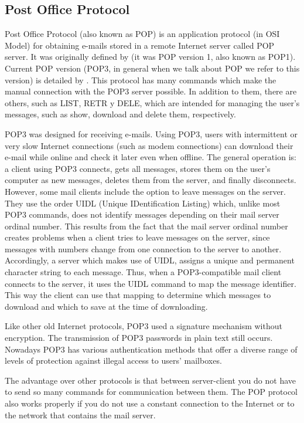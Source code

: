 \subsection{Post Office Protocol} \label{ssect:pop}

Post Office Protocol (also known as POP) is an application protocol (in OSI Model) for obtaining e-mails stored in a remote Internet server called POP server. It was originally defined by \cite{rfc918} (it was POP version 1, also known as POP1). Current POP version (POP3, in general when we talk about POP we refer to this version) is detailed by \cite{rfc1939}. This protocol has many commands which make the manual connection with the POP3 server possible. In addition to them, there are others, such as LIST, RETR y DELE, which are intended for managing the user's messages, such as show, download and delete them, respectively.

POP3 was designed for receiving e-mails. Using POP3, users with intermittent or very slow Internet connections (such as modem connections) can download their e-mail while online and check it later even when offline. The general operation is: a client using POP3 connects, gets all messages, stores them on the user's computer as new messages, deletes them from the server, and finally disconnects. However, some mail clients include the option to leave messages on the server. They use the order UIDL (Unique IDentification Listing) which, unlike most POP3 commands, does not identify messages depending on their mail server ordinal number. This results from the fact that the mail server ordinal number creates problems when a client tries to leave messages on the server, since messages with numbers change from one connection to the server to another. Accordingly, a server which makes use of UIDL, assigns a unique and permanent character string to each message. Thus, when a POP3-compatible mail client connects to the server, it uses the UIDL command to map the message identifier. This way the client can use that mapping to determine which messages to download and which to save at the time of downloading.

Like other old Internet protocols, POP3 used a signature mechanism without encryption. The transmission of POP3 passwords in plain text still occurs. Nowadays POP3 has various authentication methods that offer a diverse range of levels of protection against illegal access to users' mailboxes.

The advantage over other protocols is that between server-client you do not have to send so many commands for communication between them. The POP protocol also works properly if you do not use a constant connection to the Internet or to the network that contains the mail server.


